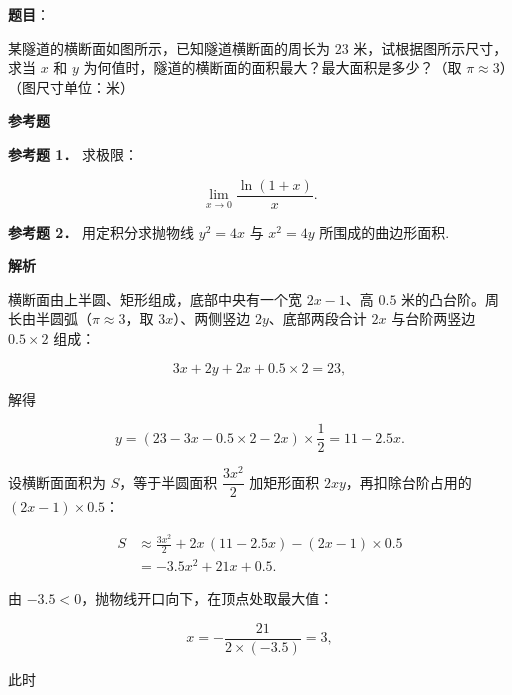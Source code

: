 \begin{answer}

\textbf{题目}：

某隧道的横断面如图所示，已知隧道横断面的周长为 $23$ 米，试根据图所示尺寸，求当 $x$ 和 $y$ 为何值时，隧道的横断面的面积最大？最大面积是多少？（取 $\pi\approx 3$）（图尺寸单位：米）
\nopagebreak[4]
\begin{center}\end{center}
\nopagebreak[4]
\begin{gktip}
\textbf{参考题}
\end{gktip}

\textbf{参考题 1．} 求极限：

\nopagebreak[4]
\[
\lim_{x\to0}\frac{\ln(1+x)}{x}.
\]

\textbf{参考题 2．} 用定积分求抛物线 $y^2=4x$ 与 $x^2=4y$ 所围成的曲边形面积.
\nopagebreak[4]
\begin{center}\end{center}
\nopagebreak[4]
\textbf{解析}

横断面由上半圆、矩形组成，底部中央有一个宽 $2x-1$、高 $0.5$ 米的凸台阶。周长由半圆弧（$\pi\approx3$，取 $3x$）、两侧竖边 $2y$、底部两段合计 $2x$ 与台阶两竖边 $0.5\times2$ 组成：
\nopagebreak[4]
\begin{center}\end{center}
\nopagebreak[4]
\nopagebreak[4]
\[
3x+2y+2x+0.5\times2=23,
\]

解得

\nopagebreak[4]
\[
y=(23-3x-0.5\times2-2x)\times\frac12=11-2.5x.
\]

设横断面面积为 $S$，等于半圆面积 $\dfrac{3x^2}{2}$ 加矩形面积 $2xy$，再扣除台阶占用的 $(2x-1)\times0.5$：

\nopagebreak[4]
\[
\begin{aligned}
S&\approx\frac{3x^2}{2}+2x\,(11-2.5x)-(2x-1)\times0.5\\
&=-3.5x^2+21x+0.5.
\end{aligned}
\]

由 $-3.5<0$，抛物线开口向下，在顶点处取最大值：

\nopagebreak[4]
\[
x=-\frac{21}{2\times(-3.5)}=3,
\]

此时


\end{answer}
